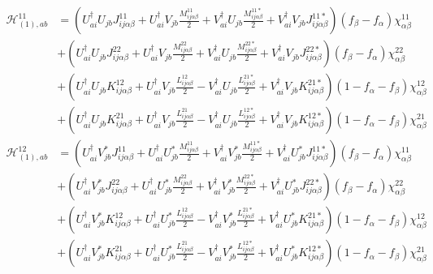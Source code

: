 \begin{align*}
\mathcal{H}_{(1),ab}^{11} 
&= \left(U_{ai}^\dagger U_{jb} J_{ij\alpha\beta}^{11} + U_{ai}^\dagger V_{jb} \frac{M_{ij\alpha\beta}^{11}}{2} + V_{ai}^\dagger U_{jb} \frac{M_{ij\alpha\beta}^{11*}}{2} + V_{ai}^\dagger V_{jb} J_{ij\alpha\beta}^{11*}  \right)(f_\beta-f_\alpha)\chi^{11}_{\alpha\beta}                   \\
&+ \left(U_{ai}^\dagger U_{jb} J_{ij\alpha\beta}^{22} + U_{ai}^\dagger V_{jb} \frac{M_{ij\alpha\beta}^{22}}{2} + V_{ai}^\dagger U_{jb} \frac{M_{ij\alpha\beta}^{22*}}{2} + V_{ai}^\dagger V_{jb} J_{ij\alpha\beta}^{22*}  \right)(f_\beta-f_\alpha)\chi^{22}_{\alpha\beta}                   \\
&+ \left(U_{ai}^\dagger U_{jb} K_{ij\alpha\beta}^{12} + U_{ai}^\dagger V_{jb} \frac{L_{ij\alpha\beta}^{12}}{2} - V_{ai}^\dagger U_{jb} \frac{L_{ij\alpha\beta}^{21*}}{2} + V_{ai}^\dagger V_{jb} K_{ij\alpha\beta}^{21*}  \right)\left(1-f_\alpha-f_\beta\right)\chi^{12}_{\alpha\beta}      \\
&+ \left(U_{ai}^\dagger U_{jb} K_{ij\alpha\beta}^{21} + U_{ai}^\dagger V_{jb} \frac{L_{ij\alpha\beta}^{21}}{2} - V_{ai}^\dagger U_{jb} \frac{L_{ij\alpha\beta}^{12*}}{2} + V_{ai}^\dagger V_{jb} K_{ij\alpha\beta}^{12*}  \right)\left(1-f_\alpha-f_\beta\right)\chi^{21}_{\alpha\beta}
\end{align*}
\begin{align*}
\mathcal{H}_{(1),ab}^{12} 
&= \left(U_{ai}^\dagger V^*_{jb} J_{ij\alpha\beta}^{11} + U_{ai}^\dagger U^*_{jb} \frac{M_{ij\alpha\beta}^{11}}{2} + V_{ai}^\dagger V^*_{jb} \frac{M_{ij\alpha\beta}^{11*}}{2} + V_{ai}^\dagger U^*_{jb} J_{ij\alpha\beta}^{11*}  \right)(f_\beta-f_\alpha)\chi^{11}_{\alpha\beta}                   \\
&+ \left(U_{ai}^\dagger V^*_{jb} J_{ij\alpha\beta}^{22} + U_{ai}^\dagger U^*_{jb} \frac{M_{ij\alpha\beta}^{22}}{2} + V_{ai}^\dagger V^*_{jb} \frac{M_{ij\alpha\beta}^{22*}}{2} + V_{ai}^\dagger U^*_{jb} J_{ij\alpha\beta}^{22*}  \right)(f_\beta-f_\alpha)\chi^{22}_{\alpha\beta}                   \\
&+ \left(U_{ai}^\dagger V^*_{jb} K_{ij\alpha\beta}^{12} + U_{ai}^\dagger U^*_{jb} \frac{L_{ij\alpha\beta}^{12}}{2} - V_{ai}^\dagger V^*_{jb} \frac{L_{ij\alpha\beta}^{21*}}{2} + V_{ai}^\dagger U^*_{jb} K_{ij\alpha\beta}^{21*}  \right)\left(1-f_\alpha-f_\beta\right)\chi^{12}_{\alpha\beta}      \\
&+ \left(U_{ai}^\dagger V^*_{jb} K_{ij\alpha\beta}^{21} + U_{ai}^\dagger U^*_{jb} \frac{L_{ij\alpha\beta}^{21}}{2} - V_{ai}^\dagger V^*_{jb} \frac{L_{ij\alpha\beta}^{12*}}{2} + V_{ai}^\dagger U^*_{jb} K_{ij\alpha\beta}^{12*}  \right)\left(1-f_\alpha-f_\beta\right)\chi^{21}_{\alpha\beta}
\end{align*}
